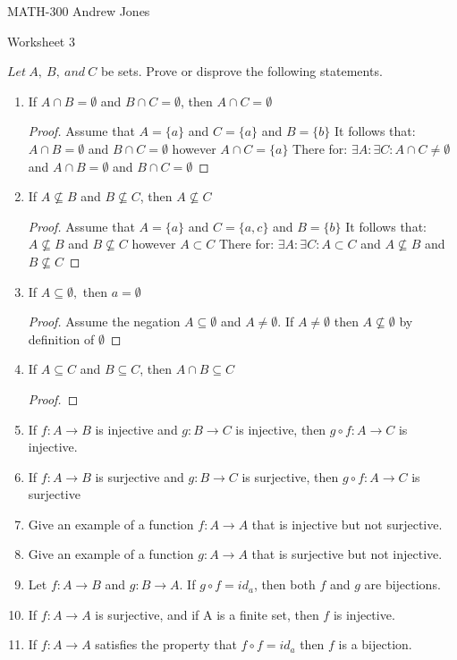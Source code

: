 \documentclass{article}
\begin{document}
  MATH-300 \hfill Andrew Jones
  \begin{center}
  {\huge Worksheet 3}
  \end{center}
  $Let\ A,\ B,\ and\ C$ be sets. Prove or disprove the following statements. \\
  \begin{enumerate}
  \item If $A\cap B = \emptyset$ and $B\cap C = \emptyset$, then $A\cap C = \emptyset$
    \begin{proof}
      Assume that $A = \{a\}$ and $C = \{a\}$ and $B = \{b\}$ 
      It follows that: $A\cap B = \emptyset$ and $B\cap C = \emptyset$ however $A\cap C = \{a\}$
      There for: $\exists A: \exists C: A\cap C \neq \emptyset$ and $A\cap B = \emptyset$ and $B\cap C = \emptyset$  
    \end{proof}
  \item If $A\not\subseteq B$ and $B\not\subseteq C$, then $A\not\subseteq C$ 
    \begin{proof}
      Assume that $A = \{a\}$ and $C = \{a, c\}$ and $B = \{b\}$ 
      It follows that: $A\not\subseteq B$ and $B\not\subseteq C$ however $A\subset C$
      There for: $\exists A: \exists C: A\subset C$ and $A\not\subseteq B$ and $B\not\subseteq C$  
    \end{proof}
  \item If $A\subseteq \emptyset,$ then $a= \emptyset$ 
    \begin{proof}
      Assume the negation $A\subseteq \emptyset$ and $A \neq \emptyset$.
      If $A \neq \emptyset$ then $A\not\subseteq \emptyset$ by definition of $\emptyset$ 
    \end{proof}
  \item If $A\subseteq C$ and $B\subseteq C$, then $A\cap B\subseteq C$
    \begin{proof}

    \end{proof}
  \item If $f : A\to B$ is injective and $g : B\to C$ is injective, then $g \circ f : A\to C$ is injective. 
  \item If $f : A\to B$ is surjective and $g : B\to C$ is surjective, then $g \circ f : A\to C$ is surjective 
  \item Give an example of a function $f : A\to A$ that is injective but not surjective. 
  \item Give an example of a function $g : A\to A$ that is surjective but not injective. 
  \item Let $f : A\to B$ and $g : B\to A$. If $g \circ f = id_{a}$, then both $f$ and $g$ are bijections.
  \item If $f : A\to A$ is surjective, and if A is a finite set, then $f$ is injective.
  \item If $f : A\to A$ satisfies the property that $f \circ f = id_{a}$ then $f$ is a bijection.
  \end{enumerate}
\end{document}
